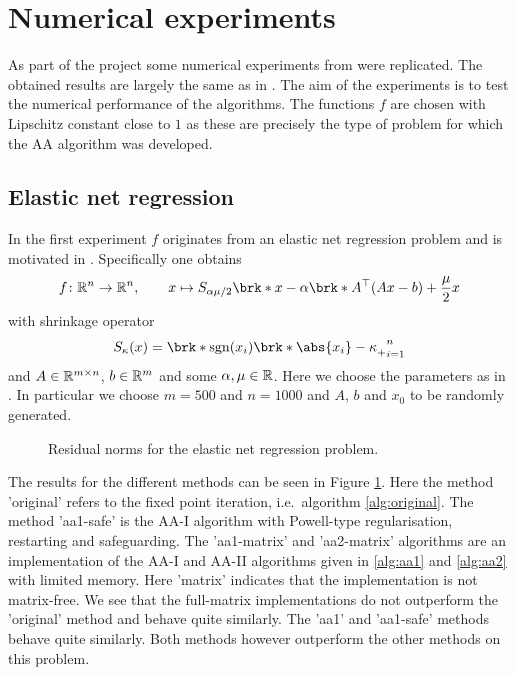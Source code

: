 \section{Numerical experiments}

As part of the project some numerical experiments from \cite{ZhaAA} were replicated. The obtained results are largely the same as in \cite{ZhaAA}. The aim of the experiments is to test the numerical performance of the algorithms. The functions $f$ are chosen with Lipschitz constant close to $1$ as these are precisely the type of problem for which the AA algorithm was developed.

\subsection{Elastic net regression}

In the first experiment $f$ originates from an elastic net regression problem and is motivated in \cite[Section 5.1f]{ZhaAA}. Specifically one obtains
\begin{align*}
	f\colon\R^{n}\to\R^{n}, \qquad x\mapsto S_{\alpha\mu/2}\brk*{x-\alpha\brk*{A^\top(Ax-b)+\frac{\mu}{2}x}}
\end{align*}
with shrinkage operator
\begin{align*}
	S_\kappa(x) = \brk*{\sgn(x_i)\brk*{\abs{x_i}-\kappa}_+}_{i=1}^{n}
\end{align*}
and $A\in\mathbb{R}^{m\times n}$, $b\in\mathbb{R}^{m}$ and some $\alpha, \mu\in\mathbb{R}$. Here we choose the parameters as in \cite[Section 5.2]{ZhaAA}. In particular we choose $m=500$ and $n=1000$ and $A$, $b$ and $x_0$ to be randomly generated.

\begin{figure}
	\centering
	{\scriptsize
	
	}
	\caption{Residual norms for the elastic net regression problem.}
	\label{pl:method_comparison_ISTA}
\end{figure}

The results for the different methods can be seen in Figure \ref{pl:method_comparison_ISTA}. Here the method 'original' refers to the fixed point iteration, i.e.\ algorithm \ref{alg:original}. The method 'aa1-safe' is the AA-I algorithm with Powell-type regularisation, restarting and safeguarding. The 'aa1-matrix' and 'aa2-matrix' algorithms are an implementation of the AA-I and AA-II algorithms given in \ref{alg:aa1} and \ref{alg:aa2} with limited memory. Here 'matrix' indicates that the implementation is not matrix-free. We see that the full-matrix implementations do not outperform the 'original' method and behave quite similarly. The 'aa1' and 'aa1-safe' methods behave quite similarly. Both methods however outperform the other methods on this problem.

